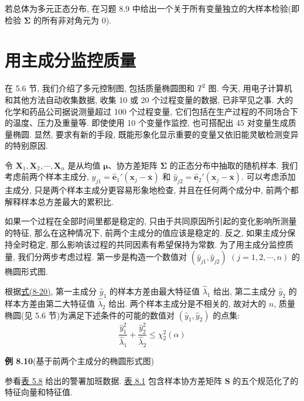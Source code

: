 
若总体为多元正态分布, 在习题 8.9 中给出一个关于所有变量独立的大样本检验(即检验 $\boldsymbol{\Sigma}$ 的所有非对角元为 0).

\section{用主成分监控质量}  %
\label{sec:8.6}

在 5.6 节, 我们介绍了多元控制图, 包括质量椭圆图和 $T^2$ 图. 今天, 用电子计算机和其他方法自动收集数据, 收集 10 或 20 个过程变量的数据, 已非罕见之事. 大的化学和药品公司据说测量超过 100 个过程变量, 它们包括在生产过程的不同场合下的温度、压力及重量等. 即使使用 10 个变量作监控, 也可搭配出 45 对变量生成质量椭圆. 显然, 要求有新的手段, 既能形象化显示重要的变量又依旧能灵敏检测变异的特别原因.


令 $\mathbf{X}_1,\mathbf{X}_2,\cdots,\mathbf{X}_n$ 是从均值 $\boldsymbol{\mu}$、协方差矩阵 $\boldsymbol{\Sigma}$ 的正态分布中抽取的随机样本. 我们考虑前两个样本主成分, $\hat{y}_{j1}=\hat{\mathbf{e}}_1'(\mathbf{x}_j-\bar{\mathbf{x}})$ 和 $\hat{y}_{j2}=\hat{\mathbf{e}}_2'(\mathbf{x}_j-\bar{\mathbf{x}})$. 可以考虑添加主成分, 只是两个样本主成分更容易形象地检查, 并且在任何两个成分中, 前两个都解释样本总方差最大的累积比.

如果一个过程在全部时间里都是稳定的, 只由于共同原因所引起的变化影响所测量的特征, 那么在这种情况下, 前两个主成分的值应该是稳定的. 反之, 如果主成分保持全时稳定, 那么影响该过程的共同因素有希望保持为常数. 为了用主成分监控质量, 我们分两步考虑过程. 第一步是构造一个数值对 $(\hat{y}_{j1},\hat{y}_{j2})$ $(j=1,2,\cdots,n)$ 的椭圆形式图.

根据\hyperref[eq:8-20]{式(8-20)}, 第一主成分 $\hat{y}_1$ 的样本方差由最大特征值 $\hat{\lambda}_1$ 给出, 第二主成分 $\hat{y}_2$ 的样本方差由第二大特征值 $\hat{\lambda}_2$ 给出. 两个样本主成分是不相关的, 故对大的 $n$, 质量椭圆(见 5.6 节)为满足下述条件的可能的数值对 $(\hat{y}_1,\hat{y}_2)$ 的点集:
\label{eq:8-36}
\begin{equation}
\frac{\hat{y}_1^2}{\hat{\lambda}_1}+\frac{\hat{y}_2^2}{\hat{\lambda}_2}\leqslant\chi_2^2(\alpha) \tag{8-36}
\end{equation}

\noindent\textbf{例 8.10}\quad (基于前两个主成分的椭圆形式图)

参看\hyperref[tab:5.8]{表 5.8} 给出的警署加班数据. \hyperref[tab:8.1]{表 8.1} 包含样本协方差矩阵 $\mathbf{S}$ 的五个规范化了的特征向量和特征值.

